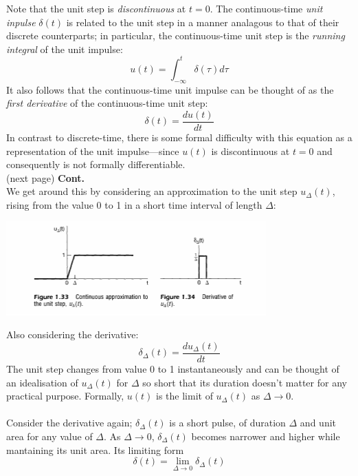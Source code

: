 \documentclass{report}
\begin{document}
Note that the unit step is \textit{discontinuous} at $t=0$. The continuous-time \textit{unit inpulse} $\delta(t)$ is related to the
unit step in a manner analagous to that of their discrete counterparts; in particular, the continuous-time unit step is the
\textit{running integral} of the unit impulse:
\begin{equation*}
u(t)=\int^t_{-\infty}\delta(\tau)d\tau
\end{equation*}
It also follows that the continuous-time unit impulse can be thought of as the \textit{first derivative} of the continuous-time unit step:
\begin{equation*}
\delta(t)=\frac{du(t)}{dt}
\end{equation*}
In contrast to discrete-time, there is some formal difficulty with this equation as a representation of the unit impulse---since $u(t)$ is 
discontinuous at $t=0$ and consequently is not formally differentiable.\\
(next page)\newpage 
\noindent\textbf{Cont.}\\
We get around this by considering an approximation to the unit step
$u_\Delta(t)$, rising from the value 0 to 1 in a short time interval of
length $\Delta$:
\begin{center}
\includegraphics[width=10cm]{a10}
\end{center}
Also considering the derivative:
\begin{equation*}
\delta_\Delta(t)=\frac{du_\Delta(t)}{dt}
\end{equation*}
The unit step changes from value 0 to 1 instantaneously and can be thought of an idealisation of $u_\Delta(t)$ for $\Delta$ so short
that its duration doesn't matter for any practical purpose.
Formally, $u(t)$ is the limit of $u_\Delta(t)$ as $\Delta\to0$.\\
\vspace{1mm}\\
Consider the derivative again; $\delta_\Delta(t)$ is a short pulse, of duration $\Delta$ and unit area for any value of $\Delta$.
As $\Delta\to0$, $\delta_\Delta(t)$ becomes narrower and higher while mantaining its unit area. Its limiting form
\begin{equation*}
\delta(t)=\lim_{\Delta\to0}\delta_\Delta(t)
\end{equation*}
\end{document}
